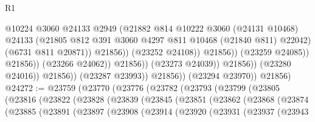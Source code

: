 \begin{lexlean}{R1}
\begin{coremodule}
                                                @10224
                                                @3060
                                                @24133
                                                @2949
                                                (@21882
                                                  @814
                                                  @10222
                                                  @3060
                                                  (@24131 @10468)
                                                  @24133
                                                  (@21805
                                                    @812
                                                    @391
                                                    @3060
                                                    @4297
                                                    @811
                                                    @10468
                                                    (@21840 @811)
                                                    @22042)
                                                  (@6731 @811 @20871))
                                                @21856))
                                            (@23252 @24108))
                                          @21856))
                                      (@23259 @24085))
                                    @21856))
                                (@23266 @24062))
                              @21856))
                          (@23273 @24039))
                        @21856))
                    (@23280 @24016))
                  @21856))
              (@23287 @23993))
            @21856))
        (@23294 @23970))
      @21856)
@24272 := @23759
    (@23770
      (@23776
        (@23782
          (@23793
            (@23799
              (@23805
                (@23816
                  (@23822
                    (@23828
                      (@23839
                        (@23845
                          (@23851
                            (@23862
                              (@23868
                                (@23874
                                  (@23885
                                    (@23891
                                      (@23897
                                        (@23908
                                          (@23914
                                            (@23920
                                              (@23931
                                                (@23937
                                                  (@23943

\end{coremodule}
\end{lexlean}
